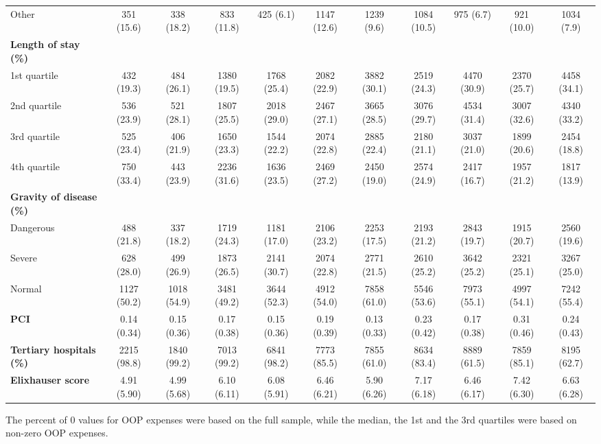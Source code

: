 \documentclass[ijerph,article,submit,moreauthors,pdftex,10pt,a4paper]{mdpi}
\theoremstyle{mdpi}
\newcounter{ex}
\newcounter{re}
\theoremstyle{mdpidefinition}
\begin{document}
\begin{landscape}
\begin{table}[]
{\begin{tabular}{@{}lcccccccccc@{}}
\quad Other   & 351 (15.6)   & 338 (18.2)   & 833 (11.8)   & 425 (6.1)    & 1147 (12.6)  & 1239 (9.6)   & 1084 (10.5)  & 975 (6.7)    & 921 (10.0)   & 1034 (7.9)   \\
\textbf{Length of stay (\%)}&    &    &    &    &    &    &    &    &    &    \\
\quad 1st quartile   & 432 (19.3)   & 484 (26.1)   & 1380 (19.5)  & 1768 (25.4)  & 2082 (22.9)  & 3882 (30.1)  & 2519 (24.3)  & 4470 (30.9)  & 2370 (25.7)  & 4458 (34.1)  \\
\quad 2nd quartile   & 536 (23.9)   & 521 (28.1)   & 1807 (25.5)  & 2018 (29.0)  & 2467 (27.1)  & 3665 (28.5)  & 3076 (29.7)  & 4534 (31.4)  & 3007 (32.6)  & 4340 (33.2)  \\
\quad 3rd quartile   & 525 (23.4)   & 406 (21.9)   & 1650 (23.3)  & 1544 (22.2)  & 2074 (22.8)  & 2885 (22.4)  & 2180 (21.1)  & 3037 (21.0)  & 1899 (20.6)  & 2454 (18.8)  \\
\quad 4th quartile   & 750 (33.4)   & 443 (23.9)   & 2236 (31.6)  & 1636 (23.5)  & 2469 (27.2)  & 2450 (19.0)  & 2574 (24.9)  & 2417 (16.7)  & 1957 (21.2)  & 1817 (13.9)  \\
\textbf{Gravity of disease (\%)}  &    &    &    &    &    &    &    &    &    &    \\
\quad Dangerous& 488 (21.8)   & 337 (18.2)   & 1719 (24.3)  & 1181 (17.0)  & 2106 (23.2)  & 2253 (17.5)  & 2193 (21.2)  & 2843 (19.7)  & 1915 (20.7)  & 2560 (19.6)  \\
\quad Severe& 628 (28.0)   & 499 (26.9)   & 1873 (26.5)  & 2141 (30.7)  & 2074 (22.8)  & 2771 (21.5)  & 2610 (25.2)  & 3642 (25.2)  & 2321 (25.1)  & 3267 (25.0)  \\
\quad Normal  & 1127 (50.2)  & 1018 (54.9)  & 3481 (49.2)  & 3644 (52.3)  & 4912 (54.0)  & 7858 (61.0)  & 5546 (53.6)  & 7973 (55.1)  & 4997 (54.1)  & 7242 (55.4)  \\
\textbf{PCI}     & 0.14 (0.34)  & 0.15 (0.36)  & 0.17 (0.38)  & 0.15 (0.36)  & 0.19 (0.39)  & 0.13 (0.33)  & 0.23 (0.42)  & 0.17 (0.38)  & 0.31 (0.46)  & 0.24 (0.43)  \\
\textbf{Tertiary hospitals (\%)} & 2215 (98.8)  & 1840 (99.2)  & 7013 (99.2)  & 6841 (98.2)  & 7773 (85.5)  & 7855 (61.0)  & 8634 (83.4)  & 8889 (61.5)  & 7859 (85.1)  & 8195 (62.7)  \\
\textbf{Elixhauser score}   & 4.91 (5.90)  & 4.99 (5.68)  & 6.10 (6.11)  & 6.08 (5.91)  & 6.46 (6.21)  & 5.90 (6.26)  & 7.17 (6.18)  & 6.46 (6.17)  & 7.42 (6.30)  & 6.63 (6.28)  \\ \bottomrule
\end{tabular} 
}
\raggedright The percent of 0 values for OOP expenses were based on the full sample, while the median, the 1st and the 3rd quartiles were based on non-zero OOP expenses.
\end{table}
\end{landscape}
\end{document}
